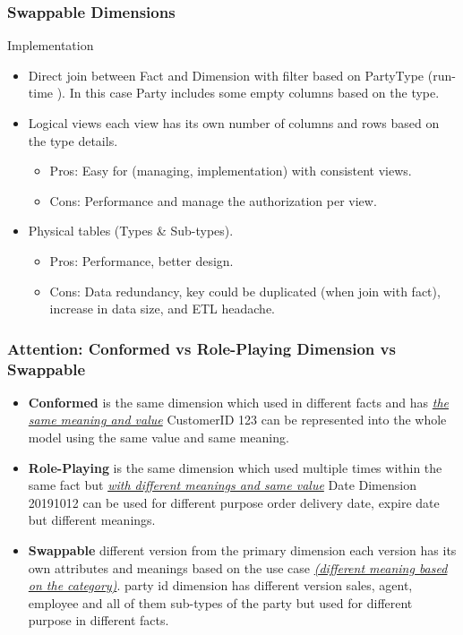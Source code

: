 \begin{frame}
\frametitle{Swappable Dimensions}
\begin{block}{Implementation}
	\begin{itemize}
		\item Direct join between Fact and Dimension with filter based on PartyType (run-time ). In this case Party includes some empty columns based on the type.
		\item Logical views each view has its own number of columns and rows based on the type details.
		\begin{itemize}
			\item Pros: Easy for (managing, implementation) with consistent views.
			\item Cons: Performance and manage the authorization per view.
		\end{itemize}	
		\item Physical tables (Types \& Sub-types).
		\begin{itemize}
			\item Pros: Performance, better design.
			\item Cons: Data redundancy, key could be duplicated (when join with fact), increase in data size, and ETL headache.
		\end{itemize}
	
	\end{itemize}
\end{block}
\end{frame}
\begin{frame}
\frametitle{Attention: Conformed vs Role-Playing Dimension vs Swappable}
	\begin{itemize}[<+->]
		\item \textbf{Conformed} is the same dimension which used in different facts and has
		\textit{\underline{the same meaning and value}} \forexample CustomerID 123 can be represented into the whole model
		using the same value and same meaning.
		\item \textbf{Role-Playing} is the same dimension which used multiple times within the same fact but
		\textit{\underline{with different meanings and same value}} \forexample Date Dimension 20191012 can be used for
		different purpose order delivery date, expire date but different meanings.
		\item \textbf{Swappable} different version from the primary dimension each version has its own attributes and
		meanings based on the use case \textit{\underline{(different meaning based on the category)}}.
		\forexample party id dimension has different version sales, agent, employee and all of them sub-types of the
		party but used for different purpose in different facts.

	\end{itemize}

\end{frame}

